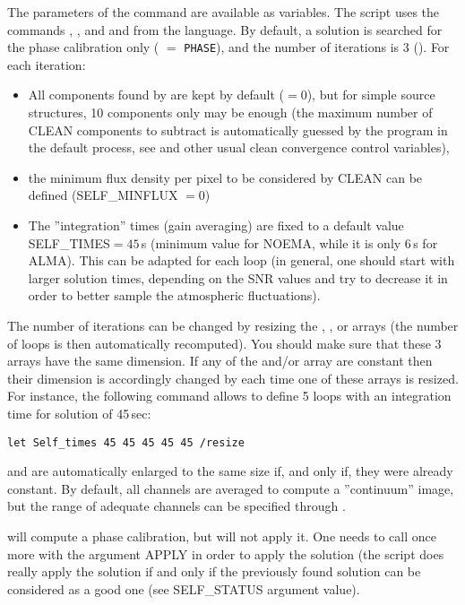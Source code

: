 The parameters of the command  are available as 
 \sic{} variables.  The script uses the commands 
, , and   and  from the 
 language. By default, a solution is searched for the 
phase calibration only ( $=$ \texttt{PHASE}), and 
the number of iterations is 3 (). For each 
iteration: 
\begin{itemize}\itemsep 0pt
\item All components found by  are kept by default 
($=0$), but for simple source structures, 10 components only 
may be enough (the maximum number  of  CLEAN components to 
subtract is automatically guessed by the program in the default 
process, see  and other usual clean convergence control 
variables),
\item the minimum flux density per pixel to be considered by CLEAN can 
be defined (SELF\_MINFLUX $=0$) 
\item The ''integration'' times (gain averaging) are fixed to a default 
value SELF\_{TIMES}$=45$\,s (minimum value for NOEMA, while it is only 
6\,s for ALMA). This can be adapted for each loop (in general, one 
should start with larger solution times, depending on the SNR values 
and try to decrease it in order to better sample the atmospheric 
fluctuations). 
\end{itemize}
The number of iterations can be changed by resizing the 
, , or  
arrays (the number of loops  is then automatically 
recomputed). You should make sure that these 3 arrays have the same 
dimension. If any of the  and/or 
 array are constant then their dimension is 
accordingly changed by  each time one of these arrays is 
resized. For instance, the following command allows to define 5 loops 
with an integration time for solution of 45\,sec:
\begin{verbatim}
let Self_times 45 45 45 45 45 /resize
\end{verbatim}
 and  are automatically enlarged
to the same size if, and only if, they were already constant.
By default, all channels are averaged to compute a 
''continuum'' image, but  the range of adequate channels can be 
specified through . 

 will compute a phase calibration, but will not 
apply it. One needs to call  once more with the argument 
APPLY in order to apply the solution (the script does really apply the 
solution if and only if the previously found solution can be considered 
as a good one (see SELF\_{STATUS} argument value). 

